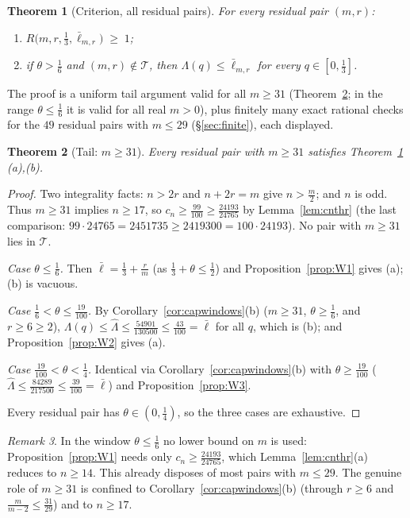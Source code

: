 \documentclass[11pt]{amsart}
\newtheorem{theorem}{Theorem}
\theoremstyle{remark}
\newtheorem{remark}[theorem]{Remark}
\newcommand{\lbar}{\bar\ell}
\newcommand{\Lhat}{\widehat\Lambda}
\begin{document}
\begin{theorem}[Criterion, all residual pairs]\label{thm:crit}
For every residual pair $(m,r)$:
\begin{enumerate}[label=\textup{(\alph*)}]
\item $R\bigl(m,r,\tfrac13,\lbar_{m,r}\bigr)\;\ge\;1$;
\item if $\theta>\tfrac16$ and $(m,r)\notin\mathcal T$, then $\Lambda(q)\le\lbar_{m,r}$ for every $q\in[0,\tfrac13]$.
\end{enumerate}
\end{theorem}

The proof is a uniform tail argument valid for all $m\ge31$ (Theorem~\ref{thm:tail}; in the range $\theta\le\tfrac16$ it is valid for all real $m>0$), plus finitely many exact rational checks for the $49$ residual pairs with $m\le29$ (\S\ref{sec:finite}), each displayed.

\begin{theorem}[Tail: $m\ge31$]\label{thm:tail}
Every residual pair with $m\ge31$ satisfies Theorem~\ref{thm:crit}\,(a),(b).
\end{theorem}

\begin{proof}
Two integrality facts: $n>2r$ and $n+2r=m$ give $n>\tfrac m2$; and $n$ is odd.  Thus $m\ge31$ implies $n\ge17$, so $c_n\ge\tfrac{99}{100}\ge\tfrac{24193}{24765}$ by Lemma~\ref{lem:cnthr} (the last comparison: $99\cdot24765=2451735\ge2419300=100\cdot24193$).  No pair with $m\ge31$ lies in $\mathcal T$.

\emph{Case $\theta\le\tfrac16$.}  Then $\lbar=\tfrac13+\tfrac rm$ (as $\tfrac13+\theta\le\tfrac12$) and Proposition~\ref{prop:W1} gives (a); (b) is vacuous.

\emph{Case $\tfrac16<\theta\le\tfrac{19}{100}$.}  By Corollary~\ref{cor:capwindows}(b) ($m\ge31$, $\theta\ge\tfrac16$, and $r\ge6\ge2$), $\Lambda(q)\le\Lhat\le\tfrac{54901}{130500}\le\tfrac{43}{100}=\lbar$ for all $q$, which is (b); and Proposition~\ref{prop:W2} gives (a).

\emph{Case $\tfrac{19}{100}<\theta<\tfrac14$.}  Identical via Corollary~\ref{cor:capwindows}(b) with $\theta\ge\tfrac{19}{100}$ ($\Lhat\le\tfrac{84289}{217500}\le\tfrac{39}{100}=\lbar$) and Proposition~\ref{prop:W3}.

Every residual pair has $\theta\in(0,\tfrac14)$, so the three cases are exhaustive.
\end{proof}

\begin{remark}\label{rmk:realm}
In the window $\theta\le\tfrac16$ no lower bound on $m$ is used: Proposition~\ref{prop:W1} needs only $c_n\ge\tfrac{24193}{24765}$, which Lemma~\ref{lem:cnthr}(a) reduces to $n\ge14$.  This already disposes of most pairs with $m\le29$.  The genuine role of $m\ge31$ is confined to Corollary~\ref{cor:capwindows}(b) (through $r\ge6$ and $\tfrac m{m-2}\le\tfrac{31}{29}$) and to $n\ge17$.
\end{remark}
\end{document}

